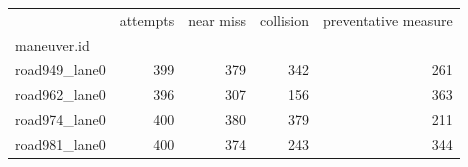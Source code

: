 \begin{tabular}{lrrrr}
\toprule
 & attempts & near miss & collision & preventative measure \\
maneuver.id &  &  &  &  \\
\midrule
road949_lane0 & 399 & 379 & 342 & 261 \\
road962_lane0 & 396 & 307 & 156 & 363 \\
road974_lane0 & 400 & 380 & 379 & 211 \\
road981_lane0 & 400 & 374 & 243 & 344 \\
\bottomrule
\end{tabular}
